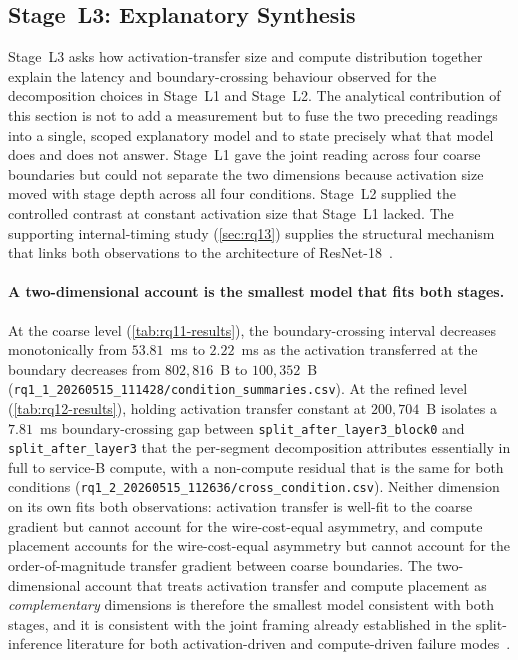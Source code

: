 \subsection{Stage~L3: Explanatory Synthesis}
\label{sec:analysis-rq13}

Stage~L3 asks how activation-transfer size and compute distribution together
explain the latency and boundary-crossing behaviour observed for the
decomposition choices in Stage~L1 and Stage~L2. The analytical contribution of
this section is not to add a measurement but to fuse the two preceding
readings into a single, scoped explanatory model and to state precisely
what that model does and does not answer. Stage~L1 gave the joint reading
across four coarse boundaries but could not separate the two dimensions
because activation size moved with stage depth across all four
conditions. Stage~L2 supplied the controlled contrast at constant
activation size that Stage~L1 lacked. The supporting internal-timing study
(\cref{sec:rq13}) supplies the structural mechanism that links both
observations to the architecture of ResNet-18~\cite{resnet}.

\paragraph{A two-dimensional account is the smallest model that fits both stages.}
At the coarse level (\cref{tab:rq11-results}), the boundary-crossing
interval decreases monotonically from \(53.81\)~ms to \(2.22\)~ms as
the activation transferred at the boundary decreases from
\(802{,}816\)~B to \(100{,}352\)~B
(\texttt{rq1\_1\_20260515\_111428/condition\_summaries.csv}). At the
refined level (\cref{tab:rq12-results}), holding activation transfer
constant at \(200{,}704\)~B isolates a \(7.81\)~ms boundary-crossing
gap between \texttt{split\_after\_layer3\_block0} and
\texttt{split\_after\_layer3} that the per-segment decomposition
attributes essentially in full to service-B compute, with a non-compute
residual that is the same for both conditions
(\texttt{rq1\_2\_20260515\_112636/cross\_condition.csv}). Neither
dimension on its own fits both observations: activation transfer is
well-fit to the coarse gradient but cannot account for the
wire-cost-equal asymmetry, and compute placement accounts for the
wire-cost-equal asymmetry but cannot account for the order-of-magnitude
transfer gradient between coarse boundaries. The two-dimensional
account that treats activation transfer and compute placement as
\emph{complementary} dimensions is therefore the smallest model
consistent with both stages, and it is consistent with the joint
framing already established in the split-inference literature for
both activation-driven and compute-driven failure
modes~\cite{neurosurgeon,dnnsplit,deeperthings}.

